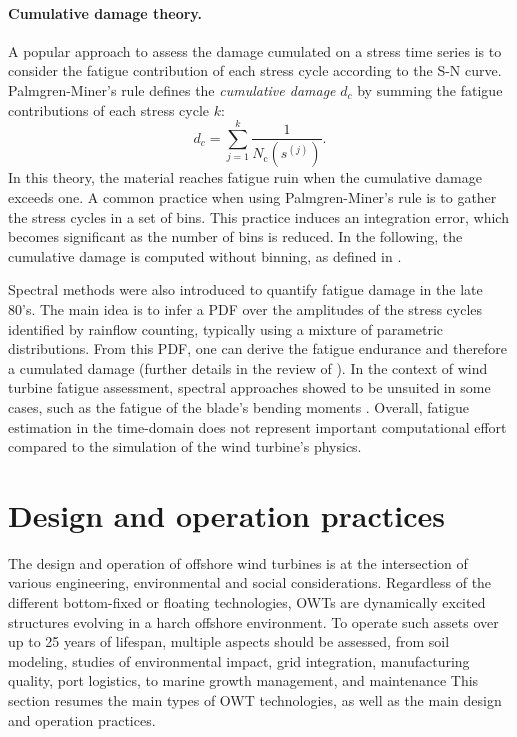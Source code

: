 \paragraph{Cumulative damage theory.}
A popular approach to assess the damage cumulated on a stress time series is to consider the fatigue contribution of each stress cycle according to the S-N curve. 
Palmgren-Miner's rule defines the \textit{cumulative damage} $d_c$ by summing the fatigue contributions of each stress cycle $k$:
\begin{equation}
    d_c = \sum_{j=1}^{k} \frac{1}{N_{\mathrm{c}}\left(s^{(j)}\right)}.
    \label{eq:miner}
\end{equation}
In this theory, the material reaches fatigue ruin when the cumulative damage exceeds one.  
A common practice when using Palmgren-Miner's rule is to gather the stress cycles in a set of bins. 
This practice induces an integration error, which becomes significant as the number of bins is reduced. 
In the following, the cumulative damage is computed without binning, as defined in .


Spectral methods were also introduced to quantify fatigue damage in the late 80's. 
The main idea is to infer a PDF over the amplitudes of the stress cycles identified by rainflow counting, typically using a mixture of parametric distributions. 
From this PDF, one can derive the fatigue endurance and therefore a cumulated damage (further details in the review of \citet{dirlik_2021}). 
In the context of wind turbine fatigue assessment, spectral approaches showed to be unsuited in some cases, such as the fatigue of the blade's bending moments \citep{ragan_2007_dirlik_vs_miner}.  
Overall, fatigue estimation in the time-domain does not represent important computational effort compared to the simulation of the wind turbine's physics. 


\section{Design and operation practices} \label{sec:owt_design}

The design and operation of offshore wind turbines is at the intersection of various engineering, environmental and social considerations. 
Regardless of the different bottom-fixed or floating technologies, OWTs are dynamically excited structures evolving in a harch offshore environment.   
To operate such assets over up to 25 years of lifespan, multiple aspects should be assessed, from soil modeling, studies of environmental impact, grid integration, manufacturing quality, port logistics, to marine growth management, and maintenance
This section resumes the main types of OWT technologies, as well as the main design and operation practices.   

